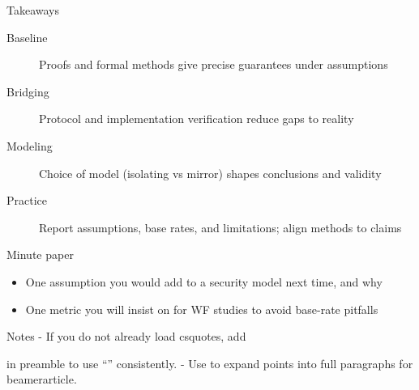 \begin{frame}{Takeaways}
  \begin{description}
    \item[Baseline] Proofs and formal methods give precise guarantees under assumptions
    \item[Bridging] Protocol and implementation verification reduce gaps to reality
    \item[Modeling] Choice of model (isolating vs mirror) shapes conclusions and validity
    \item[Practice] Report assumptions, base rates, and limitations; align methods to claims
  \end{description}
\end{frame}

\begin{frame}{Minute paper}
  \begin{itemize}
    \item One assumption you would add to a security model next time, and why
    \item One metric you will insist on for WF studies to avoid base-rate pitfalls
  \end{itemize}
\end{frame}

Notes
- If you do not already load csquotes, add \usepackage{csquotes} in preamble to use \enquote{} consistently.
- Use  to expand points into full paragraphs for beamerarticle.

